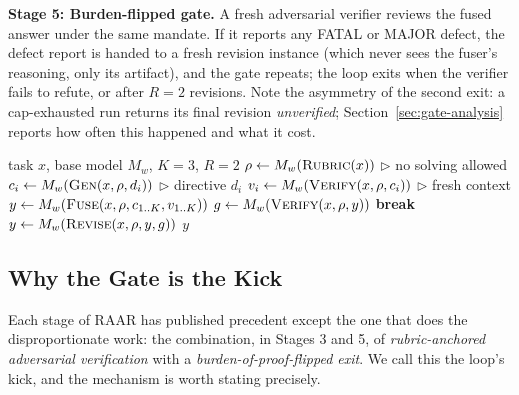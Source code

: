 \documentclass[journal]{IEEEtran}
\newcommand{\method}{RAAR}
\newcommand{\methodlong}{Rubric-Anchored Adversarial Refinement}
\begin{document}
\textbf{Stage 5: Burden-flipped gate.} A fresh adversarial verifier reviews
the fused answer under the same mandate. If it reports any FATAL or MAJOR
defect, the defect report is handed to a fresh revision instance
(which never sees the fuser's reasoning, only its artifact), and the gate
repeats; the loop exits when the verifier fails to refute, or after $R{=}2$
revisions. Note the asymmetry of the second exit: a cap-exhausted run
returns its final revision \emph{unverified}; Section~\ref{sec:gate-analysis}
reports how often this happened and what it cost.

\begin{algorithm}[t]
\caption{\method{}: \methodlong{}}
\label{alg:raar}
\begin{algorithmic}[1]
\REQUIRE task $x$, base model $M_w$, $K{=}3$, $R{=}2$
\STATE $\rho \leftarrow M_w(\textsc{Rubric}(x))$ \hfill$\triangleright$ no solving allowed
  \STATE $c_i \leftarrow M_w(\textsc{Gen}(x, \rho, d_i))$ \hfill$\triangleright$ directive $d_i$
\ENDFOR
{}
  \STATE $v_i \leftarrow M_w(\textsc{Verify}(x, \rho, c_i))$ \hfill$\triangleright$ fresh context
\ENDFOR
\STATE $y \leftarrow M_w(\textsc{Fuse}(x, \rho, c_{1..K}, v_{1..K}))$
  \STATE $g \leftarrow M_w(\textsc{Verify}(x, \rho, y))$
   \STATE \textbf{break} \ENDIF
  \STATE $y \leftarrow M_w(\textsc{Revise}(x, \rho, y, g))$
\ENDFOR
\RETURN $y$
\end{algorithmic}
\end{algorithm}

\subsection{Why the Gate is the Kick}
\label{sec:kick}
Each stage of \method{} has published precedent except the one that does the
disproportionate work: the combination, in Stages 3 and 5, of
\emph{rubric-anchored adversarial verification} with a
\emph{burden-of-proof-flipped exit}. We call this the loop's kick, and the
mechanism is worth stating precisely.
\end{document}
